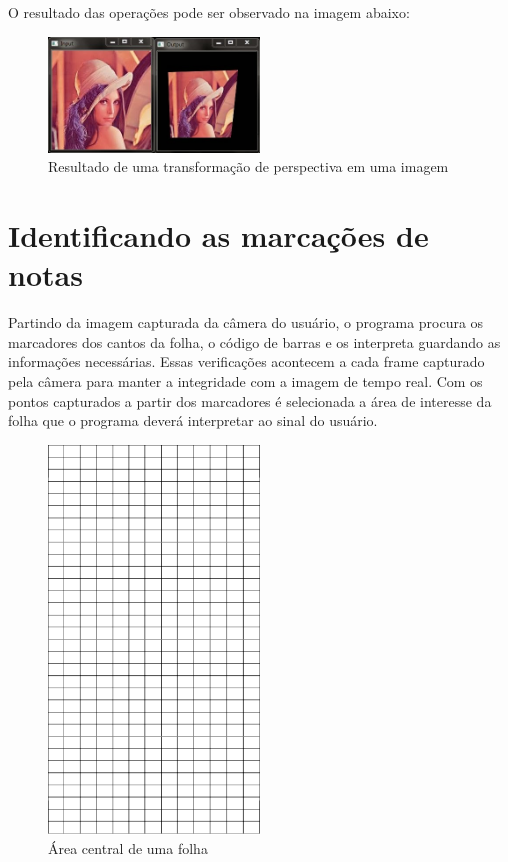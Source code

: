 \documentclass[12pt]{report}
\begin{document}
O resultado das operações pode ser observado na imagem abaixo:

\begin{figure}[H]
  \centering
    \includegraphics[width=0.5\textwidth]{imagens/Perspective_Transform.JPG}
    \caption{Resultado de uma transformação de perspectiva em uma imagem}
  \label{fig:perspectiva}
\end{figure}

\section{Identificando as marcações de notas}
\label{sec:ident_notas}

Partindo da imagem capturada da câmera do usuário, o programa procura
os marcadores dos cantos da folha, o código de barras e os interpreta
guardando as informações necessárias. Essas verificações acontecem a
cada frame capturado pela câmera para manter a integridade com a
imagem de tempo real. Com os pontos capturados a partir dos marcadores
é selecionada a área de interesse da folha que o programa deverá
interpretar ao sinal do usuário.

\begin{figure}[H]
  \centering
    \includegraphics[angle=90,origin=c,width=0.5\textwidth]{imagens/aoi.png}
    \caption{Área central de uma folha}
  \label{fig:aoi_aoi}
\end{figure}
\end{document}
